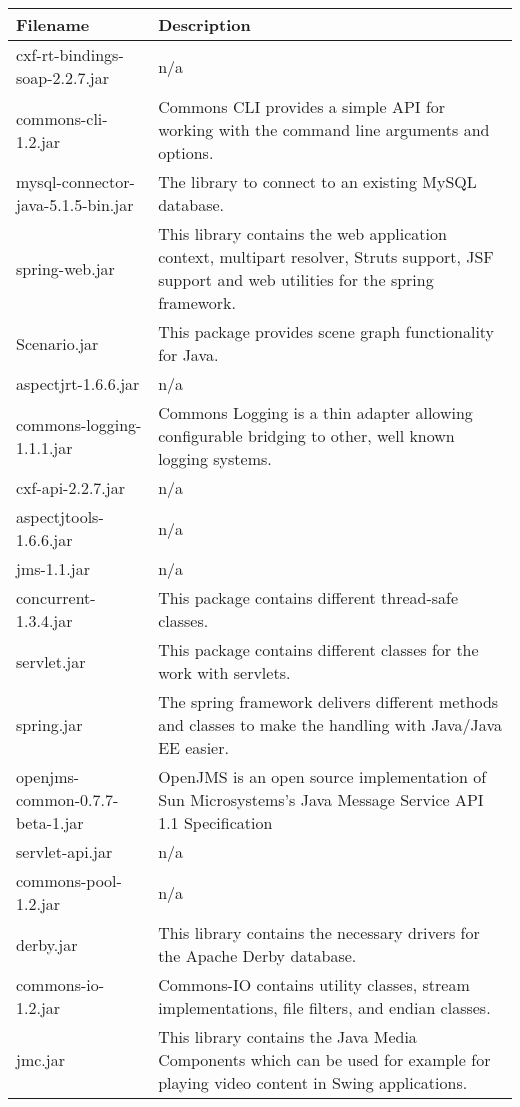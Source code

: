 \begin{center}
\begin{longtable}{|p{}|p{}|}
\hline 
Filename & Description\\
\hline
\hline 
cxf-rt-bindings-soap-2.2.7.jar & n/a\\
\hline 
commons-cli-1.2.jar & Commons CLI provides a simple API for working with the command line arguments and options.\\
\hline 
mysql-connector-java-5.1.5-bin.jar & The library to connect to an existing MySQL database.\\
\hline 
spring-web.jar & This library contains the web application context, multipart resolver, Struts support, JSF support and web utilities for the spring framework.\\
\hline 
Scenario.jar & This package provides scene graph functionality for Java.\\
\hline 
aspectjrt-1.6.6.jar & n/a\\
\hline 
commons-logging-1.1.1.jar & Commons Logging is a thin adapter allowing configurable bridging to other, well known logging systems.\\
\hline 
cxf-api-2.2.7.jar & n/a\\
\hline 
aspectjtools-1.6.6.jar & n/a\\
\hline 
jms-1.1.jar & n/a\\
\hline 
concurrent-1.3.4.jar & This package contains different thread-safe classes.\\
\hline 
servlet.jar & This package contains different classes for the work with servlets.\\
\hline 
spring.jar & The spring framework delivers different methods and classes to make the handling with Java/Java EE easier.\\
\hline 
openjms-common-0.7.7-beta-1.jar & OpenJMS is an open source implementation of Sun Microsystems's Java Message Service API 1.1 Specification\\
\hline 
servlet-api.jar & n/a\\
\hline 
commons-pool-1.2.jar & n/a\\
\hline 
derby.jar & This library contains the necessary drivers for the Apache Derby database.\\
\hline 
commons-io-1.2.jar & Commons-IO contains utility classes, stream implementations, file filters, and endian classes.\\
\hline 
jmc.jar & This library contains the Java Media Components which can be used for example for playing video content in Swing applications.\\

\end{longtable}
\end{center}
